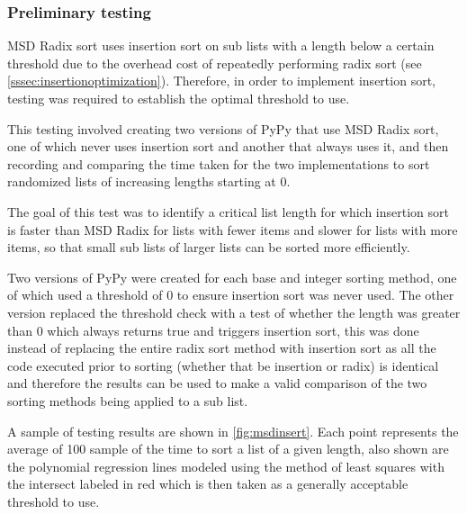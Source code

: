 \documentclass[12pt]{article}
\begin{document}
\subsubsection{Preliminary testing}
\label{sssec:insertiontesting}
MSD Radix sort uses insertion sort on sub lists with a length below a certain threshold due to the overhead cost of repeatedly performing radix sort (see \ref{sssec:insertionoptimization}). Therefore, in order to implement insertion sort, testing was required to establish the optimal threshold to use.
\par
This testing involved creating two versions of PyPy that use MSD Radix sort, one of which never uses insertion sort and another that always uses it, and then recording and comparing the time taken for the two implementations to sort randomized lists of increasing lengths starting at 0. 
\par
The goal of this test was to identify a critical list length for which insertion sort is faster than MSD Radix for lists with fewer items and slower for lists with more items, so that small sub lists of larger lists can be sorted more efficiently.
\par
Two versions of PyPy were created for each base and integer sorting method, one of which used a threshold of $0$ to ensure insertion sort was never used. The other version replaced the threshold check with a test of whether the length was greater than 0 which always returns true and triggers insertion sort, this was done instead of replacing the entire radix sort method with insertion sort as all the code executed prior to sorting (whether that be insertion or radix) is identical and therefore the results can be used to make a valid comparison of the two sorting methods being applied to a sub list.
\par
A sample of testing results are shown in \autoref{fig:msdinsert}. Each point represents the average of 100 sample of the time to sort a list of a given length, also shown are the polynomial regression lines modeled using the method of least squares with the intersect labeled in red which is then taken as a generally acceptable threshold to use.
\begin{table}[h]
	\begin{minipage}{\textwidth}
		\centering
		
		\label{fig:msdinsert}
	\end{minipage}
	
\end{table}
\pagebreak
\end{document}
